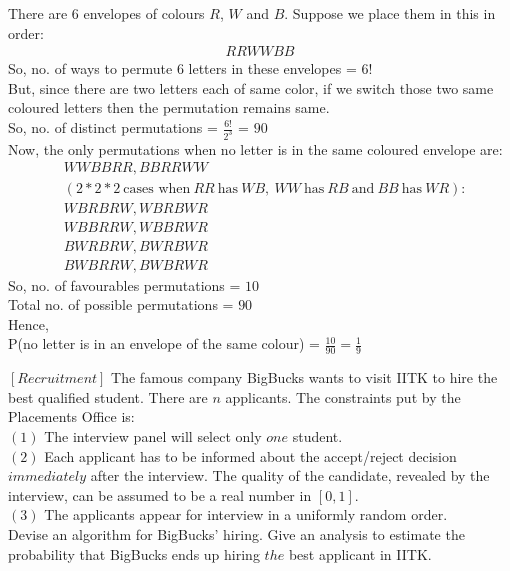 \documentclass[12pt]{article}
\begin{document}
    \begin{solution}
        There are 6 envelopes of colours $R$, $W$ and $B$. Suppose we place them in this in order:
        \begin{align*}
            RRWWBB
        \end{align*}
        So, no. of ways to permute 6 letters in these envelopes = $6!$\\
        But, since there are two letters each of same color, if we switch those two same coloured letters then the permutation remains same.\\
        So, no. of distinct permutations = $\frac{6!}{2^3}$ = $90$\\
        Now, the only permutations when no letter is in the same coloured envelope are:
        \begin{align*}
        & WWBBRR, BBRRWW\\
        & (2*2*2\: \text{cases when}\: RR\: \text{has} \:WB,\: WW \:\text{has} \:RB\: \text{and} \:BB \:\text{has}\: WR) : \\
        & WBRBRW, WBRBWR\\
        & WBBRRW, WBBRWR\\
        & BWRBRW, BWRBWR\\
        & BWBRRW, BWBRWR
        \end{align*}
        So, no. of favourables permutations = $10$\\
        Total no. of possible permutations = $90$\\
        Hence,\\ P(no letter is in an envelope of the same colour) = $\frac{10}{90}=\frac{1}{9}$
    \end{solution}

    \begin{question}
        $[Recruitment]$ The famous company BigBucks wants to visit IITK to hire the best qualified student. There are $n$ applicants. The constraints put by the Placements Office is:\\
        $(1)$ The interview panel will select only $one$ student.\\
        $(2)$ Each applicant has to be informed about the accept/reject decision $immediately$ after the interview. The quality of the candidate, revealed by the interview, can be assumed to be a real number in $[0, 1]$.\\
        $(3)$ The applicants appear for interview in a uniformly random order.\\ Devise an algorithm for BigBucks’ hiring. Give an analysis to estimate the probability that BigBucks ends up hiring $the$ best applicant in IITK.
    \end{question}
\end{document}
